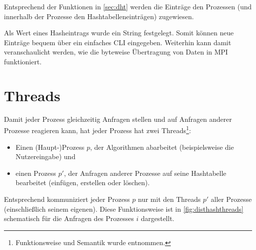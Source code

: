 \documentclass{scrreprt}
\begin{document}
Entsprechend der Funktionen in \autoref{sec:dht} werden die Einträge den Prozessen (und innerhalb der Prozesse den Hashtabelleneinträgen) zugewiesen.

Als Wert eines Hasheintrags wurde ein String festgelegt. Somit können neue Einträge bequem über ein einfaches CLI eingegeben. Weiterhin kann damit veranschaulicht werden, wie die byteweise Übertragung von Daten in MPI funktioniert.

\section{Threads}
Damit jeder Prozess gleichzeitig Anfragen stellen und auf Anfragen anderer Prozesse reagieren kann, hat jeder Prozess hat zwei Threads\footnote{Funktionsweise und Semantik wurde \cite{snir1998mpi} entnommen.}:
\begin{itemize}
\item Einen (Haupt-)Prozess $p$, der Algorithmen abarbeitet (beispielsweise die Nutzereingabe) und
\item einen Prozess $p'$, der Anfragen anderer Prozesse auf seine Hashtabelle bearbeitet (einfügen, erstellen oder löschen).
\end{itemize}

Entsprechend kommuniziert jeder Prozess $p$ nur mit den Threads $p'$ aller Prozesse (einschließlich seinem eigenen). Diese Funktionsweise ist in \autoref{fig:disthashthreads} schematisch für die Anfragen des Prozesses $i$ dargestellt.
\end{document}
